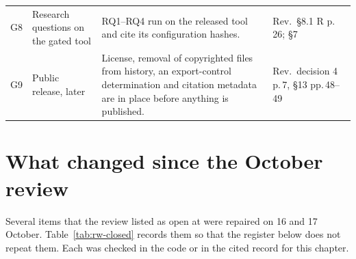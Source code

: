 {\begin{longtable}{@{}P{0.6cm}P{3.0cm}P{8.0cm}P{4.3cm}@{}}
G8 & Research questions on the gated tool & RQ1--RQ4 run on the released tool and cite its configuration hashes. & Rev.\ \S8.1 R p.\,26;  \S7 \\
G9 & Public release, later & License, removal of copyrighted files from history, an export-control determination and citation metadata are in place before anything is published. & Rev.\ decision 4 p.\,7, \S13 pp.\,48--49 \\
\bottomrule
\end{longtable}
}


\section{What changed since the October review}\label{sec:rw-closed}

Several items that the review listed as open at  were repaired on 16 and 17 October. Table~\ref{tab:rw-closed} records them so that the register below does not repeat them. Each was checked in the code or in the cited record for this chapter.

